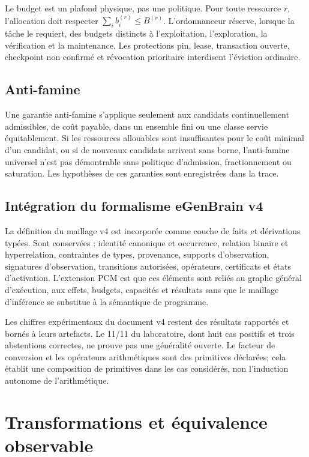 \documentclass[11pt,a4paper,openany]{book}
\theoremstyle{definition}
\theoremstyle{plain}
\theoremstyle{remark}
\begin{document}
Le budget est un plafond physique, pas une politique. Pour toute ressource $r$, l'allocation doit respecter $\sum_i b_i^{(r)}\leq B^{(r)}$. L'ordonnanceur réserve, lorsque la tâche le requiert, des budgets distincts à l'exploitation, l'exploration, la vérification et la maintenance. Les protections pin, lease, transaction ouverte, checkpoint non confirmé et révocation prioritaire interdisent l'éviction ordinaire.

\section{Anti-famine}
Une garantie anti-famine s'applique seulement aux candidats continuellement admissibles, de coût payable, dans un ensemble fini ou une classe servie équitablement. Si les ressources allouables sont insuffisantes pour le coût minimal d'un candidat, ou si de nouveaux candidats arrivent sans borne, l'anti-famine universel n'est pas démontrable sans politique d'admission, fractionnement ou saturation. Les hypothèses de ces garanties sont enregistrées dans la trace.

\section{Intégration du formalisme eGenBrain v4}
La définition du maillage v4 est incorporée comme couche de faits et dérivations typées. Sont conservées : identité canonique et occurrence, relation binaire et hyperrelation, contraintes de types, provenance, supports d'observation, signatures d'observation, transitions autorisées, opérateurs, certificats et états d'activation. L'extension PCM est que ces éléments sont reliés au graphe général d'exécution, aux effets, budgets, capacités et résultats sans que le maillage d'inférence se substitue à la sémantique de programme.

Les chiffres expérimentaux du document v4 restent des résultats rapportés et bornés à leurs artefacts. Le 11/11 du laboratoire, dont huit cas positifs et trois abstentions correctes, ne prouve pas une généralité ouverte. Le facteur de conversion et les opérateurs arithmétiques sont des primitives déclarées; cela établit une composition de primitives dans les cas considérés, non l'induction autonome de l'arithmétique.

\chapter{Transformations et équivalence observable}
\end{document}
